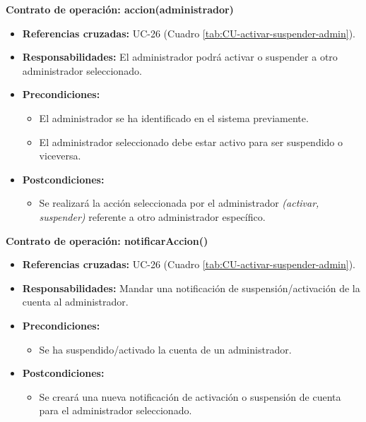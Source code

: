 \textbf{Contrato de operación: accion(administrador)}
\begin{itemize}
\item \textbf{Referencias cruzadas:} UC-26 (Cuadro \ref{tab:CU-activar-suspender-admin}).
\item \textbf{Responsabilidades:} El administrador podrá activar o suspender a otro administrador seleccionado.
\item \textbf{Precondiciones:} 
 \begin{itemize}
\item El administrador se ha identificado en el sistema previamente.
\item El administrador seleccionado debe estar activo para ser suspendido o viceversa.
\end {itemize}
\item \textbf{Postcondiciones:} 
 \begin{itemize}
\item Se realizará la acción seleccionada por el administrador \textit{(activar, suspender)} referente a otro administrador específico.
\end {itemize}
\end {itemize}

\textbf{Contrato de operación: notificarAccion()}
\begin{itemize}
\item \textbf{Referencias cruzadas:} UC-26 (Cuadro \ref{tab:CU-activar-suspender-admin}).
\item \textbf{Responsabilidades:} Mandar una notificación de suspensión/activación de la cuenta al administrador.
\item \textbf{Precondiciones:} 
 \begin{itemize}
\item Se ha suspendido/activado la cuenta de un administrador.
\end {itemize}
\item \textbf{Postcondiciones:} 
 \begin{itemize}
\item Se creará una nueva notificación de activación o suspensión de cuenta para el administrador seleccionado.
\end {itemize}
\end {itemize}

